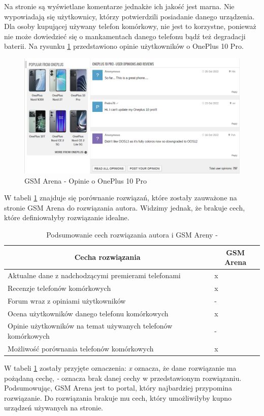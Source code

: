 Na stronie są wyświetlane komentarze jednakże ich jakość jest marna. Nie wypowiadają się użytkownicy, którzy potwierdzili posiadanie danego urządzenia. Dla osoby kupującej używany telefon komórkowy, nie jest to korzystne, ponieważ nie może dowiedzieć się o mankamentach danego telefonu bądź też degradacji baterii. Na rysunku \ref*{GSM_Arena_5} przedstawiono opinie użytkowników o OnePlus 10 Pro.
\begin{figure}[H]
    \centering
    \includegraphics[scale=0.52]{img/GSM Arena/Comments.png}
    \caption{GSM Arena - Opinie o OnePlus 10 Pro}
    \label{GSM_Arena_5}
\end{figure}

W tabeli \ref*{comparison_gsm_arena} znajduje się porównanie rozwiązań, które zostały zauważone na stronie GSM Arena do rozwiązania autora. Widzimy jednak, że brakuje cech, które definiowałyby rozwiązanie idealne.
\begin{table}
    \centering
    \begin{tabular}{|l|l|}
        \multicolumn{1}{|c|}{Cecha rozwiązania} & \multicolumn{1}{c|}{GSM Arena} \\ \hline
        Aktualne dane z nadchodzącymi premierami telefonami & x \\ \hline
        Recenzje telefonów komórkowych & x \\ \hline
        Forum wraz z opiniami użytkowników & - \\ \hline
        Ocena użytkowników danego telefonu komórkowych & x \\ \hline
        Opinie użytkowników na temat używanych telefonów komórkowych & - \\ \hline
        Możliwość porównania telefonów komórkowych & x \\ \hline
    \end{tabular}
    \caption{Podsumowanie cech rozwiązania autora i GSM Areny -}
    \label{comparison_gsm_arena}
\end{table}
W tabeli \ref*{comparison_gsm_arena} zostały przyjęte oznaczenia: \textit{x} oznacza, że dane rozwiązanie ma pożądaną cechę, \textit{-} oznacza brak danej cechy w przedstawionym rozwiązaniu.
Podsumowując, GSM Arena jest to portal, który najbardziej przypomina rozwiązanie. Do rozwiązania brakuje mu cech, który umożliwiłyby kupno urządzeń używanych na stronie.

